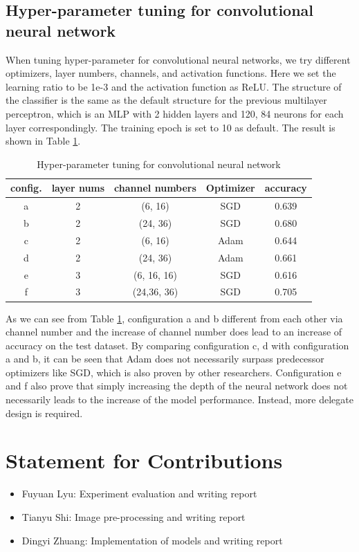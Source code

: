 \documentclass[11pt]{scrartcl}
\begin{document}
\subsection{Hyper-parameter tuning for convolutional neural network}

When tuning hyper-parameter for convolutional neural networks, we try different optimizers, layer numbers, channels, and activation functions. Here we set the learning ratio to be 1e-3 and the activation function as ReLU. The structure of the classifier is the same as the default structure for the previous multilayer perceptron, which is an MLP with 2 hidden layers and 120, 84 neurons for each layer correspondingly. The training epoch is set to 10 as default. The result is shown in Table \ref{CNN}.

\begin{table}[H]
	\centering
	\begin{tabular}{c|cccc}
		\hline
		config. & layer nums & channel numbers & Optimizer & accuracy  \\
		\hline
		a & 2 & (6, 16) 	& SGD  & 0.639 \\
		b & 2 & (24, 36) 	& SGD  & 0.680 \\
		c & 2 & (6, 16)  	& Adam & 0.644 \\
		d & 2 & (24, 36) 	& Adam & 0.661 \\
		e & 3 & (6, 16, 16) & SGD  & 0.616 \\
		f & 3 & (24,36, 36) & SGD  & 0.705 \\
		\hline
	\end{tabular} 
	\caption{Hyper-parameter tuning for convolutional neural network}
	\label{CNN}
\end{table}

As we can see from Table \ref{CNN}, configuration a and b different from each other via channel number and the increase of channel number does lead to an increase of accuracy on the test dataset. By comparing configuration c, d with configuration a and b, it can be seen that Adam does not necessarily surpass predecessor optimizers like SGD, which is also proven by other researchers\cite{reddi2019convergencee}. Configuration e and f also prove that simply increasing the depth of the neural network does not necessarily leads to the increase of the model performance. Instead, more delegate design is required. 


\section{Statement for Contributions}


\begin{itemize}
	\item Fuyuan Lyu: Experiment evaluation and writing report
	\item Tianyu Shi: Image pre-processing and writing report
	\item Dingyi Zhuang: Implementation of models and writing report
\end{itemize}



\end{document}
